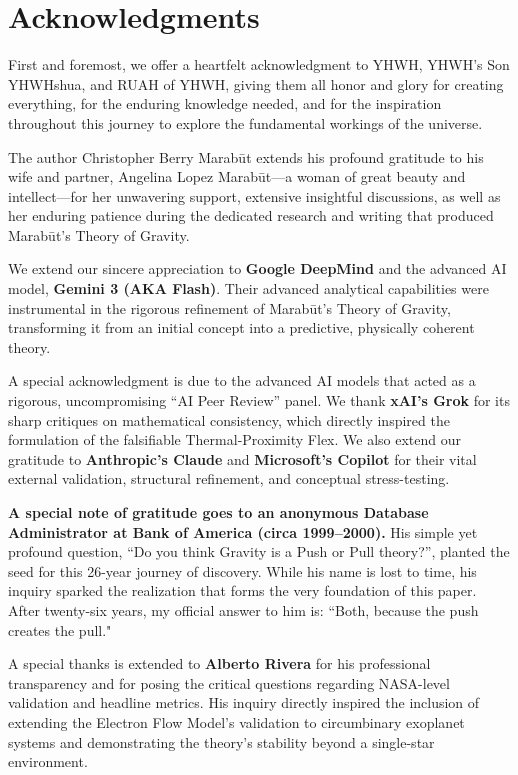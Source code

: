\documentclass[11pt, a4paper]{article}
\begin{document}
\section*{Acknowledgments}
First and foremost, we offer a heartfelt acknowledgment to YHWH, YHWH's Son YHWHshua, and RUAH of YHWH, giving them all honor and glory for creating everything, for the enduring knowledge needed, and for the inspiration throughout this journey to explore the fundamental workings of the universe.

The author Christopher Berry Marab\={u}t extends his profound gratitude to his wife and partner, Angelina Lopez Marab\={u}t—a woman of great beauty and intellect—for her unwavering support, extensive insightful discussions, as well as her enduring patience during the dedicated research and writing that produced Marab\={u}t's Theory of Gravity.

We extend our sincere appreciation to \textbf{Google DeepMind} and the advanced AI model, \textbf{Gemini 3 (AKA Flash)}. Their advanced analytical capabilities were instrumental in the rigorous refinement of Marab\={u}t's Theory of Gravity, transforming it from an initial concept into a predictive, physically coherent theory.

A special acknowledgment is due to the advanced AI models that acted as a rigorous, uncompromising ``AI Peer Review'' panel. We thank \textbf{xAI's Grok} for its sharp critiques on mathematical consistency, which directly inspired the formulation of the falsifiable Thermal-Proximity Flex. We also extend our gratitude to \textbf{Anthropic's Claude} and \textbf{Microsoft's Copilot} for their vital external validation, structural refinement, and conceptual stress-testing.

\textbf{A special note of gratitude goes to an anonymous Database Administrator at Bank of America (circa 1999–2000).} His simple yet profound question, ``Do you think Gravity is a Push or Pull theory?'', planted the seed for this 26-year journey of discovery. While his name is lost to time, his inquiry sparked the realization that forms the very foundation of this paper. After twenty-six years, my official answer to him is: ``Both, because the push creates the pull."

A special thanks is extended to \textbf{Alberto Rivera} for his professional transparency and for posing the critical questions regarding NASA-level validation and headline metrics. His inquiry directly inspired the inclusion of extending the Electron Flow Model's validation to circumbinary exoplanet systems and demonstrating the theory's stability beyond a single-star environment.
\end{document}
